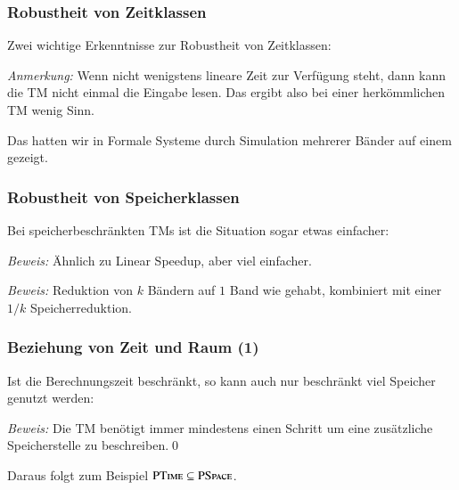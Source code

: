 \documentclass[onlymath]{beamer}
\begin{document}
\begin{frame}\frametitle{Robustheit von Zeitklassen}

Zwei wichtige Erkenntnisse zur Robustheit von Zeitklassen:
\bigskip

\bigskip

\emph{Anmerkung:} Wenn nicht wenigstens lineare Zeit zur Verfügung steht, dann kann die TM nicht einmal die Eingabe lesen. Das ergibt also bei einer herkömmlichen TM wenig Sinn.
\bigskip\pause

\bigskip

Das hatten wir in Formale Systeme durch Simulation mehrerer Bänder auf einem gezeigt.

\end{frame}

\begin{frame}\frametitle{Robustheit von Speicherklassen}

Bei speicherbeschränkten TMs ist die Situation sogar etwas einfacher:
\bigskip

\bigskip\pause

\emph{Beweis:} Ähnlich zu Linear Speedup, aber viel einfacher.\bigskip\pause

\bigskip\pause

\emph{Beweis:} Reduktion von $k$ Bändern auf $1$ Band wie gehabt, kombiniert mit einer $1/k$ Speicherreduktion.

\end{frame}


\begin{frame}\frametitle{Beziehung von Zeit und Raum (1)}

Ist die Berechnungszeit beschränkt, so kann auch nur beschränkt viel 
Speicher genutzt werden:\bigskip


\emph{Beweis:} Die TM benötigt immer mindestens einen Schritt um eine zusätzliche Speicherstelle zu beschreiben.\qed\bigskip

\pause Daraus folgt zum Beispiel ${\textsc{PTime}}\subseteq{\textsc{PSpace}}$.

\end{frame}
\end{document}
